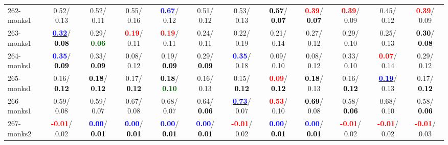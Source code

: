 \begin{table}[h]
\begin{center}
{\begin{tabular}{lc|c|c|c|c|c|c|c|c|c|c}
262-monks1 &   0.52/  0.13 &   0.52/  0.11 &   0.55/  0.16 & \underline{\textcolor{blue}{\textbf{  0.67}}}/  0.12 &   0.51/  0.12 &   0.53/  0.13 & \textcolor{black}{\textbf{  0.57}}/\textcolor{black}{\textbf{  0.07}} & \textcolor{red}{\textbf{  0.39}}/\textcolor{black}{\textbf{  0.07}} & \textcolor{red}{\textbf{  0.39}}/  0.09 &   0.45/  0.12 & \textcolor{red}{\textbf{  0.39}}/  0.09 \\
263-monks1 & \underline{\textcolor{blue}{\textbf{  0.32}}}/\textcolor{black}{\textbf{  0.08}} &   0.29/\textcolor{darkgreen}{\textbf{  0.06}} & \textcolor{red}{\textbf{  0.19}}/  0.11 & \textcolor{red}{\textbf{  0.19}}/  0.11 &   0.24/  0.11 &   0.22/  0.19 &   0.21/  0.14 &   0.27/  0.12 &   0.29/  0.10 &   0.25/  0.13 & \textcolor{black}{\textbf{  0.30}}/\textcolor{black}{\textbf{  0.08}} \\ \hline
264-monks1 & \textcolor{blue}{\textbf{  0.35}}/\textcolor{black}{\textbf{  0.09}} &   0.33/\textcolor{black}{\textbf{  0.09}} &   0.08/  0.12 &   0.19/\textcolor{black}{\textbf{  0.09}} &   0.29/\textcolor{black}{\textbf{  0.09}} & \textcolor{blue}{\textbf{  0.35}}/  0.18 &   0.09/  0.10 &   0.08/  0.12 &   0.33/  0.10 & \textcolor{red}{\textbf{  0.07}}/  0.14 &   0.29/  0.12 \\
265-monks1 &   0.16/\textcolor{black}{\textbf{  0.12}} & \textcolor{black}{\textbf{  0.18}}/\textcolor{black}{\textbf{  0.12}} &   0.17/\textcolor{black}{\textbf{  0.12}} & \textcolor{black}{\textbf{  0.18}}/\textcolor{darkgreen}{\textbf{  0.10}} &   0.16/  0.13 &   0.15/\textcolor{black}{\textbf{  0.12}} & \textcolor{red}{\textbf{  0.09}}/\textcolor{black}{\textbf{  0.12}} & \textcolor{black}{\textbf{  0.18}}/  0.13 &   0.16/\textcolor{black}{\textbf{  0.12}} & \underline{\textcolor{blue}{\textbf{  0.19}}}/  0.13 &   0.17/\textcolor{black}{\textbf{  0.12}} \\
266-monks1 &   0.59/  0.08 &   0.59/  0.07 &   0.67/  0.08 &   0.68/  0.07 &   0.64/\textcolor{black}{\textbf{  0.06}} & \underline{\textcolor{blue}{\textbf{  0.73}}}/  0.07 & \textcolor{red}{\textbf{  0.53}}/  0.10 & \textcolor{black}{\textbf{  0.69}}/  0.08 &   0.58/\textcolor{black}{\textbf{  0.06}} &   0.68/  0.10 &   0.58/\textcolor{black}{\textbf{  0.06}} \\
267-monks2 & \textcolor{red}{\textbf{ -0.01}}/  0.02 & \textcolor{blue}{\textbf{  0.00}}/\textcolor{black}{\textbf{  0.01}} & \textcolor{blue}{\textbf{  0.00}}/\textcolor{black}{\textbf{  0.01}} & \textcolor{blue}{\textbf{  0.00}}/\textcolor{black}{\textbf{  0.01}} & \textcolor{blue}{\textbf{  0.00}}/\textcolor{black}{\textbf{  0.01}} & \textcolor{red}{\textbf{ -0.01}}/  0.02 & \textcolor{blue}{\textbf{  0.00}}/\textcolor{black}{\textbf{  0.01}} & \textcolor{blue}{\textbf{  0.00}}/\textcolor{black}{\textbf{  0.01}} & \textcolor{red}{\textbf{ -0.01}}/  0.02 & \textcolor{red}{\textbf{ -0.01}}/  0.02 & \textcolor{red}{\textbf{ -0.01}}/  0.03 \\

\end{tabular}}
\end{center}
\end{table}
